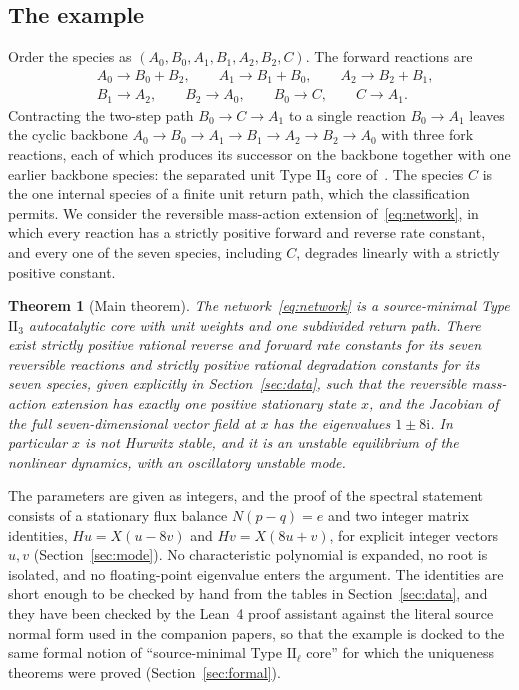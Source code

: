 \documentclass[11pt,a4paper]{article}
\theoremstyle{plain}
\newtheorem{theorem}{Theorem}[section]
\theoremstyle{definition}
\theoremstyle{remark}
\numberwithin{equation}{section}
\newcommand{\II}{\mathrm{II}}
\newcommand{\iu}{\mathrm{i}}
\begin{document}
\subsection*{The example}
Order the species as $(A_0,B_0,A_1,B_1,A_2,B_2,C)$. The forward reactions are
\begin{equation}\label{eq:network}
\begin{aligned}
&A_0\to B_0+B_2,\qquad A_1\to B_1+B_0,\qquad A_2\to B_2+B_1,\\
&B_1\to A_2,\qquad B_2\to A_0,\qquad B_0\to C,\qquad C\to A_1 .
\end{aligned}
\end{equation}
Contracting the two-step path $B_0\to C\to A_1$ to a single reaction $B_0\to A_1$ leaves the cyclic backbone $A_0\to B_0\to A_1\to B_1\to A_2\to B_2\to A_0$ with three fork reactions, each of which produces its successor on the backbone together with one earlier backbone species: the separated unit Type $\II_3$ core of~\cite{NNU26}. The species $C$ is the one internal species of a finite unit return path, which the classification permits. We consider the reversible mass-action extension of~\eqref{eq:network}, in which every reaction has a strictly positive forward and reverse rate constant, and every one of the seven species, including $C$, degrades linearly with a strictly positive constant.

\begin{theorem}[Main theorem]\label{thm:main}
The network~\eqref{eq:network} is a source-minimal Type $\II_3$ autocatalytic core with unit weights and one subdivided return path. There exist strictly positive rational reverse and forward rate constants for its seven reversible reactions and strictly positive rational degradation constants for its seven species, given explicitly in Section~\ref{sec:data}, such that the reversible mass-action extension has exactly one positive stationary state $x$, and the Jacobian of the full seven-dimensional vector field at $x$ has the eigenvalues $1\pm8\iu$. In particular $x$ is not Hurwitz stable, and it is an unstable equilibrium of the nonlinear dynamics, with an oscillatory unstable mode.
\end{theorem}

The parameters are given as integers, and the proof of the spectral statement consists of a stationary flux balance $N(p-q)=e$ and two integer matrix identities, $Hu=X(u-8v)$ and $Hv=X(8u+v)$, for explicit integer vectors $u,v$ (Section~\ref{sec:mode}). No characteristic polynomial is expanded, no root is isolated, and no floating-point eigenvalue enters the argument. The identities are short enough to be checked by hand from the tables in Section~\ref{sec:data}, and they have been checked by the Lean~4 proof assistant against the literal source normal form used in the companion papers, so that the example is docked to the same formal notion of ``source-minimal Type $\II_\ell$ core'' for which the uniqueness theorems were proved (Section~\ref{sec:formal}).
\end{document}
